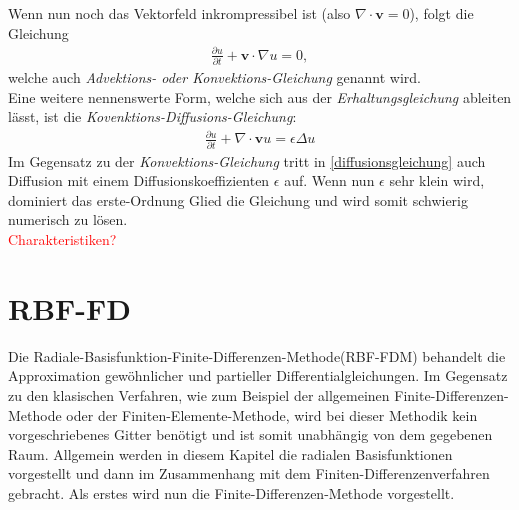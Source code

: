 \documentclass[a4paper,11pt]{article}
\newcommand{\col}[2][red]{\textcolor{#1}{#2}}
\begin{document}
Wenn nun noch das Vektorfeld inkrompressibel ist (also $\nabla \cdot \textbf{v}=0$), folgt die Gleichung
\begin{align}
 \frac{\partial u}{\partial t}+\textbf{v}\cdot\nabla u=0,
\end{align}
welche auch \textit{Advektions- oder Konvektions-Gleichung} genannt wird.\\
Eine weitere nennenswerte Form, welche sich aus der \textit{Erhaltungsgleichung} ableiten lässt, ist die \textit{Kovenktions-Diffusions-Gleichung}:
\begin{align}
 \frac{\partial u}{\partial t}+\nabla \cdot \textbf{v}u = \epsilon\Delta u\label{diffusionsgleichung}
\end{align}
Im Gegensatz zu der \textit{Konvektions-Gleichung} tritt in \eqref{diffusionsgleichung} auch Diffusion mit einem Diffusionskoeffizienten $\epsilon$ auf. Wenn nun $\epsilon$ sehr klein wird, dominiert das erste-Ordnung Glied die Gleichung und wird somit schwierig numerisch zu lösen.\\
\col{Charakteristiken?}
~\cite{segal2013numerik}
\pagebreak
\section{RBF-FD}\label{sec:RBF-FD}
Die Radiale-Basisfunktion-Finite-Differenzen-Methode(RBF-FDM) behandelt die Approximation gewöhnlicher und partieller Differentialgleichungen. Im Gegensatz zu den klasischen Verfahren, wie zum Beispiel der allgemeinen Finite-Differenzen-Methode oder der Finiten-Elemente-Methode, wird bei dieser Methodik kein vorgeschriebenes Gitter benötigt und ist somit unabhängig von dem gegebenen Raum. Allgemein werden in diesem Kapitel die radialen Basisfunktionen vorgestellt und dann im Zusammenhang mit dem Finiten-Differenzenverfahren gebracht. Als erstes wird nun die Finite-Differenzen-Methode vorgestellt.
\end{document}
